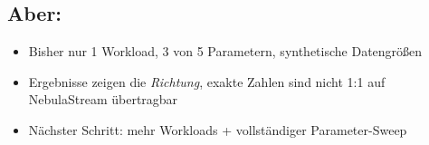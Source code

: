 \documentclass[11pt,a4paper]{scrartcl}
\begin{document}
\subsection*{Aber:}

\begin{itemize}
  \item Bisher nur 1 Workload, 3 von 5 Parametern, synthetische Datengrößen
  \item Ergebnisse zeigen die \emph{Richtung}, exakte Zahlen sind nicht 1:1 auf NebulaStream übertragbar
  \item Nächster Schritt: mehr Workloads + vollständiger Parameter-Sweep
\end{itemize}
\end{document}
